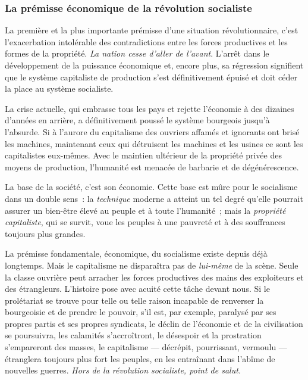\documentclass[french,twoside]{book} %
\begin{document}
\subsubsection[{La prémisse économique de la révolution socialiste}]{La prémisse économique de la révolution socialiste}
\noindent La première et la plus importante prémisse d’une situation révolutionnaire, c’est l’exacerbation intolérable des contradictions entre les forces productives et les formes de la propriété. \emph{La nation cesse d’aller de l’avant}. L’arrêt dans le développement de la puissance économique et, encore plus, sa régression signifient que le système capitaliste de production s’est définitivement épuisé et doit céder la place au système socialiste.\par
 La crise actuelle, qui embrasse tous les pays et rejette l’économie à des dizaines d’années en arrière, a définitivement poussé le système bourgeois jusqu’à l’absurde. Si à l’aurore du capitalisme des ouvriers affamés et ignorants ont brisé les machines, maintenant ceux qui détruisent les machines et les usines ce sont les capitalistes eux-mêmes. Avec le maintien ultérieur de la propriété privée des moyens de production, l’humanité est menacée de barbarie et de dégénérescence.\par
La base de la société, c’est son économie. Cette base est mûre pour le socialisme dans un double sens : la \emph{technique} moderne a atteint un tel degré qu’elle pourrait assurer un bien-être élevé au peuple et à toute l’humanité ; mais la \emph{propriété capitaliste}, qui se survit, voue les peuples à une pauvreté et à des souffrances toujours plus grandes.\par
La prémisse fondamentale, économique, du socialisme existe depuis déjà longtemps. Mais le capitalisme ne disparaîtra pas de \emph{lui-même} de la scène. Seule la classe ouvrière peut arracher les forces productives des mains des exploiteurs et des étrangleurs. L’histoire pose avec acuité cette tâche devant nous. Si le prolétariat se trouve pour telle ou telle raison incapable de renverser la bourgeoisie et de prendre le pouvoir, s’il est, par exemple, paralysé par ses propres partis et ses propres syndicats, le déclin de l’économie et de la civilisation se poursuivra, les calamités s’accroîtront, le désespoir et la prostration s’empareront des masses, le capitalisme — décrépit, pourrissant, vermoulu — étranglera toujours plus fort les peuples, en les entraînant dans l’abîme de nouvelles guerres. \emph{Hors de la révolution socialiste, point de salut.}
\end{document}
